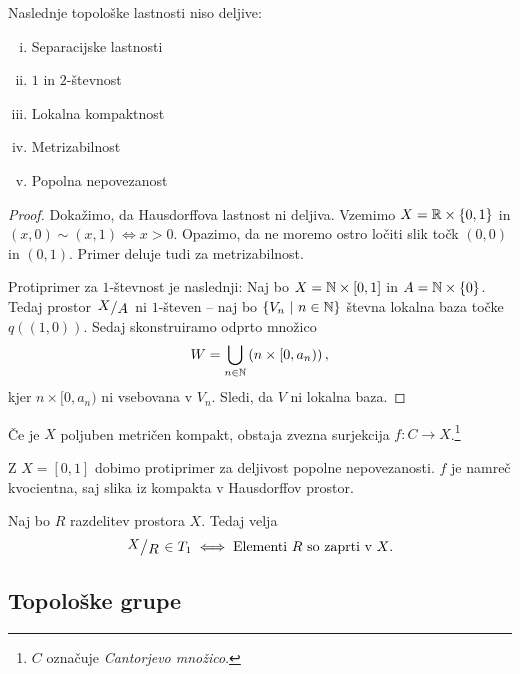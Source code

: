 \begin{trditev}
Naslednje topološke lastnosti niso deljive:

\begin{multicols}{2}
\begin{enumerate}[i)]
\item Separacijske lastnosti
\item $1$ in $2$-števnost
\item Lokalna kompaktnost
\item Metrizabilnost
\item Popolna nepovezanost
\end{enumerate}
\end{multicols}
\end{trditev}

\begin{proof}
Dokažimo, da Hausdorffova lastnost ni deljiva. Vzemimo
$X = \mathbb{R} \times \left\{0, 1\right\}$ in $(x,0) \sim (x,1) \iff x > 0$.
Opazimo, da ne moremo ostro ločiti slik točk $(0,0)$ in $(0,1)$.
Primer deluje tudi za metrizabilnost.

Protiprimer za $1$-števnost je naslednji: Naj bo
$X = \mathbb{N} \times [0,1]$ in $A = \mathbb{N} \times \left\{0\right\}$. Tedaj prostor
$\kvoc{X}{A}$ ni $1$-števen -- naj bo $\left\{V_n~\middle\vert~n \in \mathbb{N}\right\}$ števna
lokalna baza točke $q((1,0))$. Sedaj skonstruiramo odprto množico
\[
W = \bigcup_{n \in \mathbb{N}} \left(n \times [0, a_n)\right),
\]
kjer $n \times [0, a_n)$ ni vsebovana v $V_n$. Sledi, da $V$ ni
lokalna baza.
\end{proof}

\begin{izrek}[Aleksandrov]
Če je $X$ poljuben metričen kompakt, obstaja zvezna surjekcija
$f \colon C \to X$.\footnote{$C$ označuje \emph{Cantorjevo
množico}.}
\end{izrek}

\begin{opomba}
Z $X = [0, 1]$ dobimo protiprimer za deljivost popolne
nepovezanosti. $f$ je namreč kvocientna, saj slika iz kompakta v
Hausdorffov prostor.
\end{opomba}

\begin{trditev}\label{td:frec}
Naj bo $R$ razdelitev prostora $X$. Tedaj velja
\[
\kvoc{X}{R} \in T_1 \iff \text{Elementi $R$ so zaprti v $X$}.
\]
\end{trditev}

\obvs

\newpage

\subsection{Topološke grupe}

